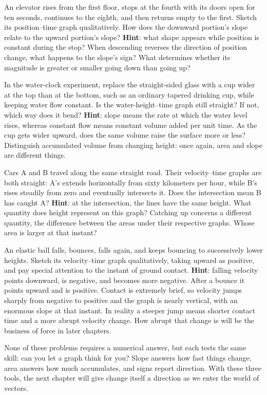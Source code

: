 \begin{puzzles}
\item An elevator rises from the first floor, stops at the fourth with its doors open for ten seconds, continues to the eighth, and then returns empty to the first. Sketch its position--time graph qualitatively. How does the downward portion's slope relate to the upward portion's slope? \textbf{Hint}: what shape appears while position is constant during the stop? When descending reverses the direction of position change, what happens to the slope's sign? What determines whether its magnitude is greater or smaller going down than going up?

\item In the water-clock experiment, replace the straight-sided glass with a cup wider at the top than at the bottom, such as an ordinary tapered drinking cup, while keeping water flow constant. Is the water-height--time graph still straight? If not, which way does it bend? \textbf{Hint}: slope means the rate at which the water level rises, whereas constant flow means constant volume added per unit time. As the cup gets wider upward, does the same volume raise the surface more or less? Distinguish accumulated volume from changing height: once again, area and slope are different things.

\item Cars A and B travel along the same straight road. Their velocity--time graphs are both straight: A's extends horizontally from sixty kilometers per hour, while B's rises steadily from zero and eventually intersects it. Does the intersection mean B has caught A? \textbf{Hint}: at the intersection, the lines have the same height. What quantity does height represent on this graph? Catching up concerns a different quantity, the difference between the areas under their respective graphs. Whose area is larger at that instant?

\item An elastic ball falls, bounces, falls again, and keeps bouncing to successively lower heights. Sketch its velocity--time graph qualitatively, taking upward as positive, and pay special attention to the instant of ground contact. \textbf{Hint}: falling velocity points downward, is negative, and becomes more negative. After a bounce it points upward and is positive. Contact is extremely brief, so velocity jumps sharply from negative to positive and the graph is nearly vertical, with an enormous slope at that instant. In reality a steeper jump means shorter contact time and a more abrupt velocity change. How abrupt that change is will be the business of force in later chapters.
\end{puzzles}

None of these problems requires a numerical answer, but each tests the same skill: can you let a graph think for you? Slope answers how fast things change, area answers how much accumulates, and signs report direction. With these three tools, the next chapter will give change itself a direction as we enter the world of vectors.
